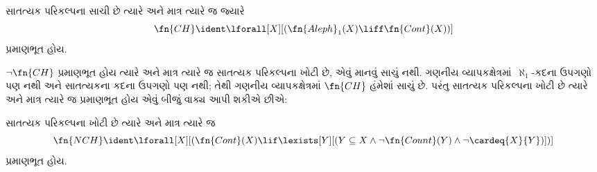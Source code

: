 \begin{prop}
સાતત્યક પરિકલ્પના સાચી છે ત્યારે અને માત્ર ત્યારે જ જ્યારે
\[\fn{CH} \ident
\lforall[X][(\fn{Aleph}_1(X) \liff \fn{Cont}(X))]\]
પ્રમાણભૂત હોય.
\end{prop}

$\lnot \fn{CH}$ પ્રમાણભૂત હોય ત્યારે અને માત્ર ત્યારે જ સાતત્યક
પરિકલ્પના ખોટી છે, એવું માનવું સાચું નથી. ગણનીય
વ્યાપકક્ષેત્રમાં~$\aleph_1$-કદના ઉપગણો પણ નથી અને સાતત્યકના
કદના ઉપગણો પણ નથી; તેથી ગણનીય વ્યાપકક્ષેત્રમાં
$\fn{CH}$ હંમેશાં સાચું છે.
પરંતુ સાતત્યક પરિકલ્પના ખોટી છે ત્યારે અને માત્ર ત્યારે જ પ્રમાણભૂત
હોય એવું બીજું વાક્ય આપી શકીએ છીએ:

\begin{prop}
સાતત્યક પરિકલ્પના ખોટી છે ત્યારે અને માત્ર ત્યારે જ
\[\fn{NCH} \ident
\lforall[X][(\fn{Cont}(X) \lif \lexists[Y][(Y \subseteq X \land \lnot
    \fn{Count}(Y) \land \lnot \cardeq{X}{Y})])]\]
પ્રમાણભૂત હોય.
\end{prop}
\endgroup


\OLEndChapterHook
\endgroup


\OLEndPartHook
